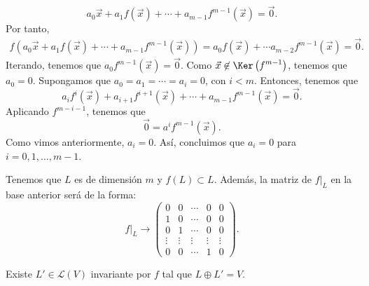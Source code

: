 \[a_{0}\vec{x} + a_{1}f\left(\vec{x}\right) + \cdots + a_{m - 1}f^{m - 1}\left(\vec{x}\right) = \vec{0} .\]
Por tanto,
\[
\begin{split}
f\left(a_{0}\vec{x} + a_{1}f\left(\vec{x}\right) + \cdots + a_{m - 1}f^{m - 1}\left(\vec{x}\right)\right) = a_{0}f\left(\vec{x}\right) + \cdots a_{m -2}f^{m -1}\left(\vec{x}\right) = \vec{0}.
\end{split}
\]
Iterando, tenemos que $\displaystyle a_{0}f^{m - 1}\left(\vec{x}\right) = \vec{0} $. Como $\displaystyle \vec{x} \not\in \Ker\left(f^{m -1}\right) $, tenemos que $\displaystyle a_{0} = 0 $. Supongamos que $\displaystyle a_{0} = a_{1} = \cdots = a_{i} = 0$, con $\displaystyle i < m $. Entonces, tenemos que 
\[ a_{i}f^{i}\left(\vec{x}\right) + a_{i+1}f^{i+1}\left(\vec{x}\right) + \cdots + a_{m -1}f^{m -1}\left(\vec{x}\right) = \vec{0} .\]
Aplicando $\displaystyle f^{m -i-1} $, tenemos que
\[\vec{0} = a^{i}f^{m -1}\left(\vec{x}\right)  .\]
Como vimos anteriormente, $\displaystyle a_{i} = 0 $. Así, concluimos que $\displaystyle a_{i} = 0 $ para $\displaystyle i = 0, 1, \ldots, m -1 $. 
\begin{observation}
\normalfont Tenemos que $\displaystyle L $ es de dimensión $\displaystyle m $ y $\displaystyle f\left(L\right) \subset L $. Además, la matriz de $\displaystyle f|_{L} $ en la base anterior será de la forma:
\[ f|_{L} \to \begin{pmatrix} 0 & 0  & \cdots &0 & 0\\
	1 & 0  & \cdots & 0 & 0 \\
0 & 1  & \cdots & 0 & 0 \\
\vdots & \vdots  & \vdots & \vdots & \vdots \\
0 & 0 & \cdots & 1 & 0 \end{pmatrix} .\]
\end{observation}
\begin{ftheorem}[]
\normalfont Existe $\displaystyle L'\in \mathcal{L}\left(V\right) $ invariante por $\displaystyle f $ tal que $\displaystyle L\oplus L' = V $.
\end{ftheorem}
